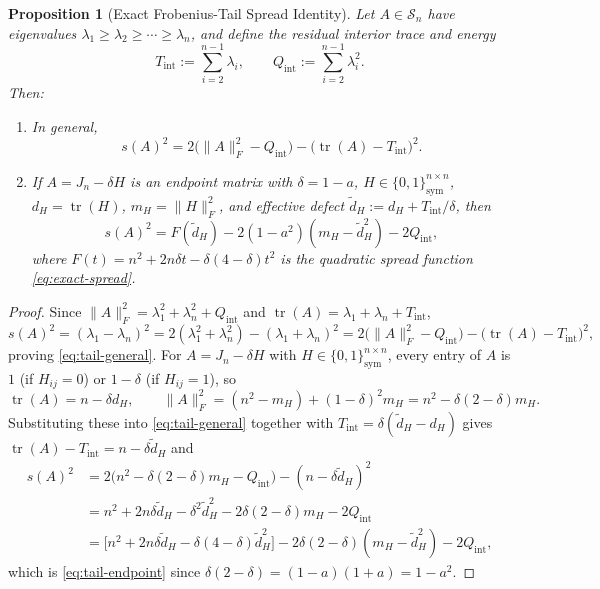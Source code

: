 \documentclass[11pt,reqno]{article}
\newtheorem{proposition}[theorem]{Proposition}
\theoremstyle{definition}
\newcommand{\tr}{\operatorname{tr}}
\begin{document}
\begin{proposition}[Exact Frobenius-Tail Spread Identity]\label{prop:tail-identity}
Let $A \in \mathcal{S}_n$ have eigenvalues $\lambda_1 \ge \lambda_2 \ge \cdots \ge \lambda_n$, and define the residual interior trace and energy
\[
T_{\mathrm{int}} := \sum_{i=2}^{n-1} \lambda_i, \qquad Q_{\mathrm{int}} := \sum_{i=2}^{n-1} \lambda_i^2.
\]
Then:
\begin{enumerate}
    \item In general,
    \begin{equation}\label{eq:tail-general}
    s(A)^2 = 2\bigl(\|A\|_F^2 - Q_{\mathrm{int}}\bigr) - \bigl(\tr(A) - T_{\mathrm{int}}\bigr)^2.
    \end{equation}
    \item If $A = J_n - \delta H$ is an endpoint matrix with $\delta = 1 - a$, $H \in \{0, 1\}^{n \times n}_{\mathrm{sym}}$, $d_H = \tr(H)$, $m_H = \|H\|_F^2$, and effective defect $\tilde{d}_H := d_H + T_{\mathrm{int}}/\delta$, then
    \begin{equation}\label{eq:tail-endpoint}
    s(A)^2 = F(\tilde{d}_H) - 2(1 - a^2)(m_H - \tilde{d}_H^2) - 2Q_{\mathrm{int}},
    \end{equation}
    where $F(t) = n^2 + 2n\delta t - \delta(4 - \delta)t^2$ is the quadratic spread function \eqref{eq:exact-spread}.
\end{enumerate}
\end{proposition}
\begin{proof}
Since $\|A\|_F^2 = \lambda_1^2 + \lambda_n^2 + Q_{\mathrm{int}}$ and $\tr(A) = \lambda_1 + \lambda_n + T_{\mathrm{int}}$,
\[
s(A)^2 = (\lambda_1 - \lambda_n)^2 = 2(\lambda_1^2 + \lambda_n^2) - (\lambda_1 + \lambda_n)^2 = 2\bigl(\|A\|_F^2 - Q_{\mathrm{int}}\bigr) - \bigl(\tr(A) - T_{\mathrm{int}}\bigr)^2,
\]
proving \eqref{eq:tail-general}. For $A = J_n - \delta H$ with $H \in \{0,1\}^{n\times n}_{\mathrm{sym}}$, every entry of $A$ is $1$ (if $H_{ij} = 0$) or $1 - \delta$ (if $H_{ij} = 1$), so
\[
\tr(A) = n - \delta d_H, \qquad \|A\|_F^2 = (n^2 - m_H) + (1 - \delta)^2 m_H = n^2 - \delta(2 - \delta)m_H.
\]
Substituting these into \eqref{eq:tail-general} together with $T_{\mathrm{int}} = \delta(\tilde{d}_H - d_H)$ gives $\tr(A) - T_{\mathrm{int}} = n - \delta \tilde{d}_H$ and
\begin{align*}
s(A)^2 &= 2\bigl(n^2 - \delta(2 - \delta)m_H - Q_{\mathrm{int}}\bigr) - (n - \delta \tilde{d}_H)^2 \\
&= n^2 + 2n\delta \tilde{d}_H - \delta^2 \tilde{d}_H^2 - 2\delta(2 - \delta)m_H - 2Q_{\mathrm{int}} \\
&= \bigl[n^2 + 2n\delta \tilde{d}_H - \delta(4 - \delta)\tilde{d}_H^2\bigr] - 2\delta(2 - \delta)(m_H - \tilde{d}_H^2) - 2Q_{\mathrm{int}},
\end{align*}
which is \eqref{eq:tail-endpoint} since $\delta(2-\delta) = (1-a)(1+a) = 1 - a^2$.
\end{proof}
\end{document}
